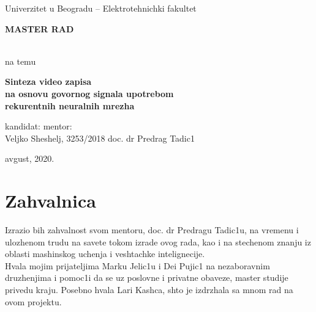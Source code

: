 \documentclass[a4paper, openany, oneside, 11pt]{book}
\begin{document}
\thispagestyle{empty}

\begin{center}
    \begin{Large}
        Univerzitet u Beogradu -- Elektrotehnichki fakultet \\ \vspace{5pt}
    \end{Large}
\end{center}
\vspace{100pt}
\begin{center}
	\begin{huge} \textbf{MASTER RAD} \end{huge} \\ 
        \vspace{10pt}
        na temu \\
        \vspace{10pt}
    \begin{huge} 
        \textbf{Sinteza video zapisa} \\ \vspace{-2pt}
        \textbf{na osnovu govornog signala upotrebom} \\ \vspace{-2pt}
        \textbf{rekurentnih neuralnih mrezha} \\
    \end{huge} 
\end{center}
\vspace{200pt}
\begin{center}
	\begin{large}
		kandidat: \hfill  mentor: \\ \vspace{5pt}
		Veljko Sheshelj, 3253/2018 \hfill doc. dr Predrag Tadic1
	\end{large}
\end{center}
\vfill
\begin{center}	
avgust, 2020.
\end{center}

\chapter*{Zahvalnica}
Izrazio bih zahvalnost svom mentoru, doc. dr Predragu Tadic1u, na vremenu i ulozhenom trudu na savete tokom izrade ovog rada, kao i na stechenom znanju iz oblasti mashinskog uchenja i veshtachke intelignecije.\\
Hvala mojim prijateljima Marku Jelic1u i Dei Pujic1 na nezaboravnim druzhenjima i pomoc1i da se uz poslovne i privatne obaveze, master studije privedu kraju. Posebno hvala Lari Kash\-ca, shto je izdrzhala sa mnom rad na ovom projektu.\\
\vspace{20pt}
\end{document}
